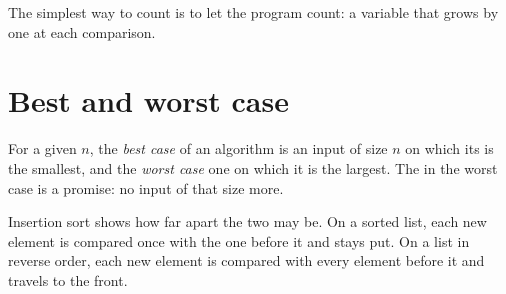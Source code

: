 The simplest way to count is to let the program count: a variable that grows by one at each comparison.

\label{lst:g11:cost-of-an-algorithm:count-linear}

\label{out:g11:cost-of-an-algorithm:count-linear}

\section{Best and worst case}\label{sec:g11:cost-of-an-algorithm:cases}

\begin{definition}\label{def:g11:cost-of-an-algorithm:cases}
For a given  $n$, the \emph{best case} of an algorithm is an input of size $n$ on which its
 is the smallest, and the \emph{worst case} one on which it is the largest. The  in the worst
case is a promise: no input of that size  more.
\end{definition}

Insertion sort shows how far apart the two may be. On a sorted list, each new element is compared once with the one
before it and stays put. On a list in reverse order, each new element is compared with every element before it and
travels to the front.

\label{lst:g11:cost-of-an-algorithm:count-insertion}

\label{out:g11:cost-of-an-algorithm:count-insertion}

